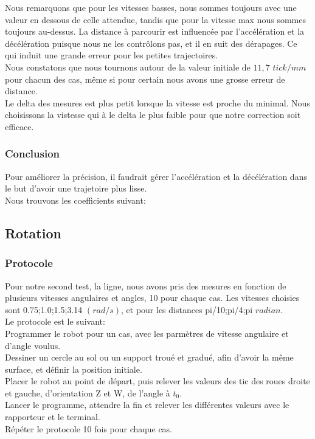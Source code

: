 \documentclass[12pt,french]{article}
\begin{document}
Nous remarquons que pour les vitesses basses, nous sommes toujours avec une valeur en dessous de celle attendue, tandis que pour la vitesse max nous sommes toujours au-dessus. La distance à parcourir est influencée par l'accélération et la décélération puisque nous ne les contrôlons pas, et il en suit des dérapages. Ce qui induit une grande erreur pour les petites trajectoires.\\
Nous constatons que nous tournons autour de la valeur initiale de $11,7$ $tick/mm$ pour chacun des cas, même si pour certain nous avons une grosse erreur de distance. \\
Le delta des mesures est plus petit lorsque la vitesse est proche du minimal. Nous choisissons la vistesse qui à le delta le plus faible pour que notre correction soit efficace.\\


\subsubsection{Conclusion}

Pour améliorer la précision, il faudrait gérer l'accélération et la décélération dans le but d'avoir une trajetoire plus lisse.\\
Nous trouvons les coefficients suivant:

\newpage

\subsection{Rotation}

\subsubsection{Protocole}
Pour notre second test, la ligne, nous avons pris des mesures en fonction de plusieurs vitesses angulaires et angles, 10 pour chaque cas.
Les vitesses choisies sont {0.75;1.0;1.5;3.14} $(rad/s)$, et pour les distances {pi/10;pi/4;pi} $radian$.\\
Le protocole est le suivant:\\
Programmer le robot pour un cas, avec les parmètres de vitesse angulaire et d'angle voulus.\\
Dessiner un cercle au sol ou un support troué et gradué, afin d'avoir la même surface, et définir la position initiale.\\
Placer le robot au point de départ, puis relever les valeurs des tic des roues droite et gauche, d'orientation Z et W, de l'angle à $t_0$.\\
Lancer le programme, attendre la fin et relever les différentes valeurs avec le rapporteur et le terminal.\\
Répéter le protocole 10 fois pour chaque cas.\\
\end{document}
